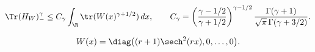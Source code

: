 \begin{equation}\label{eq:main-bound}
 \Tr(H_W)_-^\gamma\le C_\gamma\int_\R\tr(W(x)^{\gamma+1/2})\,dx,
 \qquad
 C_\gamma=
 \left(\frac{\gamma-1/2}{\gamma+1/2}\right)^{\gamma-1/2}
 \frac{\Gamma(\gamma+1)}{\sqrt\pi\,\Gamma(\gamma+3/2)}.
\end{equation}

\begin{equation}\label{eq:extremal-potential}
 W(x)=\diag\big((r+1)\sech^2(rx),0,\ldots,0\big).
\end{equation}
